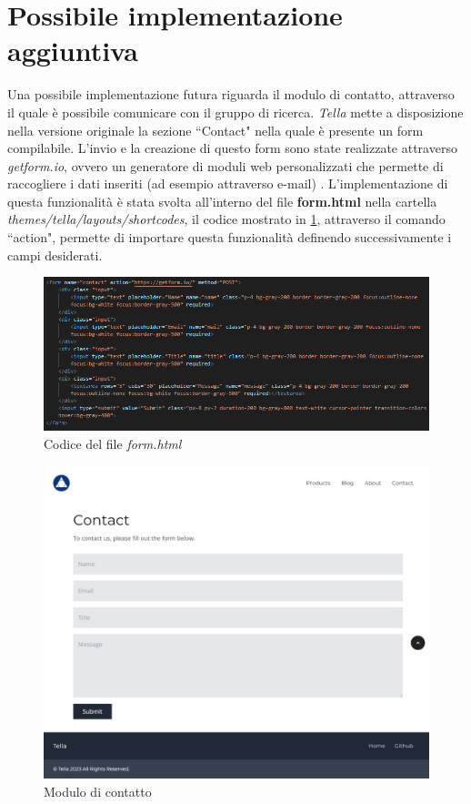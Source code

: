 \documentclass[target=bach,aauheader=]{thud}
\begin{document}
\section{Possibile implementazione aggiuntiva}
Una possibile implementazione futura riguarda il modulo di contatto, attraverso il quale è possibile comunicare con il gruppo di ricerca.
\textit{Tella} mette a disposizione nella versione originale la sezione ``Contact" nella quale è presente un form compilabile.
L'invio e la creazione di questo form sono state realizzate attraverso \textit{getform.io}, ovvero un generatore di moduli web personalizzati che permette di raccogliere i dati inseriti (ad esempio attraverso e-mail) \cite{getform}. 
L'implementazione di questa funzionalità è stata svolta all'interno del file \textbf{form.html} nella cartella \textit{themes/tella/layouts/shortcodes}, il codice mostrato in \cref{img:formc}, attraverso il comando ``action", permette di importare questa funzionalità definendo successivamente i campi desiderati.

\begin{figure}
    \centering
      \includegraphics[width=1\textwidth]{images/form-html.png}
      \caption{Codice del file \textit{form.html}}
      \label{img:formc}
\end{figure}

\begin{figure}
    \centering
    \includegraphics[width = 1\textwidth]{images/form-tella.png}
    \caption{Modulo di contatto} 
\end{figure}
\end{document}
